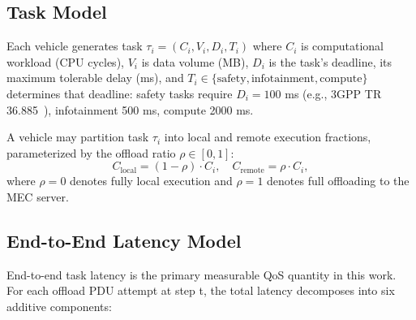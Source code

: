 \documentclass[journal,10pt,twocolumn]{IEEEtran}
\begin{document}
\subsection{Task Model}

Each vehicle generates task $\tau_i = (C_i, V_i, D_i, T_i)$ where $C_i$ is computational workload (CPU cycles), $V_i$ is data volume (MB), $D_i$ is the task's deadline, its maximum tolerable delay (ms), and $T_i \in \{\text{safety}, \text{infotainment}, \text{compute}\}$ determines that deadline: safety tasks require $D_i = 100$ ms (e.g., 3GPP TR 36.885~\cite{molina2017}), infotainment 500 ms, compute 2000 ms.

A vehicle may partition task $\tau_i$ into local and remote execution fractions, parameterized by the offload ratio $\rho \in [0, 1]$:
\begin{equation}
\label{eq:offload_ratio}
C_{\text{local}} = (1 - \rho) \cdot C_i, \quad C_{\text{remote}} = \rho \cdot C_i,
\end{equation}
where $\rho = 0$ denotes fully local execution and $\rho = 1$ denotes full offloading to the MEC server.

\subsection{End-to-End Latency Model}

End-to-end task latency is the primary measurable QoS quantity in this work. For each offload PDU attempt at step t, the total latency decomposes into six additive components:
\end{document}
